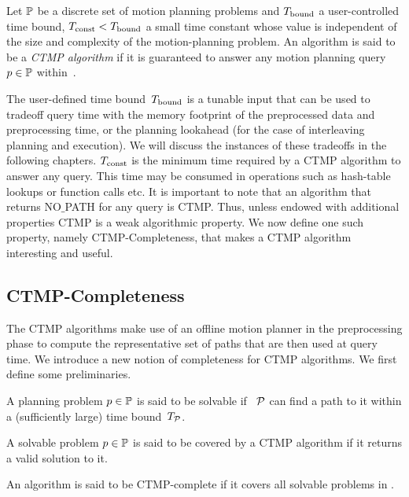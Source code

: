 \documentclass[a4paper]{report}
\begin{document}
\begin{definition}
\label{ctmp:def}
Let $\mathbb{P}$ be a discrete set of motion planning problems and $T_{\textrm{bound}}$ a user-controlled time bound,
$T_{\textrm{const}} < T_{\textrm{bound}}$ a small time constant whose value is independent of the size and complexity of the motion-planning problem.
%
An algorithm is said to be a \emph{CTMP algorithm} if it is guaranteed to answer any motion planning query $p \in \mathbb{P}$ within~\Tbound.
\end{definition}

The user-defined time bound~$T_{\textrm{bound}}$ is a tunable input that can be used to tradeoff query time with the memory footprint of the preprocessed data and preprocessing time, or the planning lookahead (for the case of interleaving planning and execution). We will discuss the instances of these tradeoffs in the following chapters.
%
$T_{\textrm{const}}$ is the minimum time required by a CTMP algorithm to answer any query. This time may be consumed in operations such as hash-table lookups or function calls etc.
%
It is important to note that an algorithm that returns NO$\_$PATH for any query is CTMP. Thus, unless endowed with additional properties CTMP is a weak algorithmic property.
We now define one such property, namely CTMP-Completeness, that makes a CTMP algorithm interesting and useful.

\subsection{CTMP-Completeness}
The CTMP algorithms make use of an offline motion planner \calP in the preprocessing phase to compute the representative set of paths that are then used at query time. We introduce a new notion of completeness for CTMP algorithms. We first define some preliminaries.
\vspace{2mm}
\begin{definition}[Solvability]
\label{def:reachable}
A planning problem $p \in \mathbb{P}$ is said to be solvable if~$~\mathcal{P}$ can find a path to it within a (sufficiently large) time bound~$T_\textrm{\ensuremath{\mathcal{P}}}$. 
\end{definition}

\vspace{2mm}
\begin{definition}[Coverage]
\label{def:covered}
    A solvable problem $p \in \mathbb{P}$ is said to be covered by a CTMP algorithm if it returns a valid solution to it.
\end{definition}

\vspace{2mm}
\begin{definition}
\label{def:complete}
An algorithm is said to be CTMP-complete if it covers all solvable problems in \pset.
\end{definition}
\end{document}
